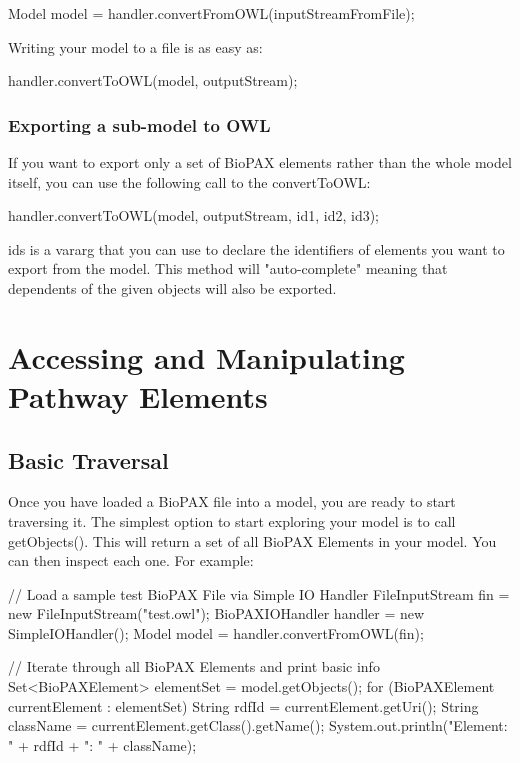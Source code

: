 \documentclass{tufte-book}
\begin{document}
\begin{javacode}
Model model = handler.convertFromOWL(inputStreamFromFile);
\end{javacode}


Writing your model to a file is as easy as: 

\begin{javacode}
handler.convertToOWL(model, outputStream);
\end{javacode}


\subsection{Exporting a sub-model to OWL}

If you want to export only a set of BioPAX elements rather than the whole model itself, you can use the following call to the convertToOWL:

\begin{javacode}
handler.convertToOWL(model, outputStream, id1, id2, id3);
\end{javacode}


ids is a vararg that you can use to declare the identifiers of elements you want to export from the model. This method will "auto-complete" meaning that dependents of the given objects will also be exported.

\chapter{Accessing and Manipulating Pathway Elements}

\section{Basic Traversal} 

Once you have loaded a BioPAX file into a model, you are ready to start traversing it.
The simplest option to start exploring your model is to call getObjects(). This will return a set of all BioPAX Elements in your model. You can then inspect each one. For example:

\begin{javacode}
// Load a sample test BioPAX File via Simple IO Handler
FileInputStream fin = new FileInputStream("test.owl");
BioPAXIOHandler handler = new SimpleIOHandler();
Model model = handler.convertFromOWL(fin);

// Iterate through all BioPAX Elements and print basic info
Set<BioPAXElement> elementSet = model.getObjects();
for (BioPAXElement currentElement : elementSet)
{
 String rdfId = currentElement.getUri();
 String className = 
 currentElement.getClass().getName();
 System.out.println("Element: " + rdfId + ": " + className);
}
\end{javacode}
\end{document}
